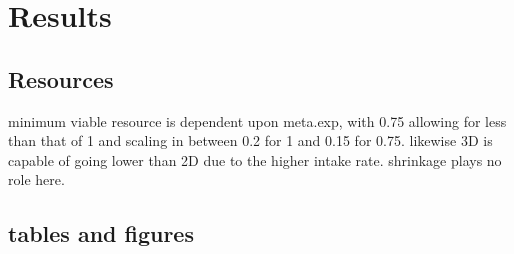 \documentclass[a4paper, 11pt, hidelinks]{article} %
\begin{document}
	

	\nolinenumbers
\section{Results}
	\linenumbers


	\subsection{Resources}
	minimum viable resource is dependent upon meta.exp, with 0.75 allowing for less than that of 1 and scaling in between 0.2 for 1 and 0.15 for 0.75. likewise 3D is capable of going lower than 2D due to the higher intake rate.  shrinkage plays no role here.
	

	\subsection{tables and figures}
	
\end{document}
